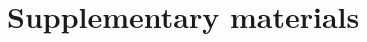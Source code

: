 \documentclass[../thesis.tex]{subfiles}
\begin{document}
    
    
    
    \newpage
    \section*{Supplementary materials}
    
\end{document}
